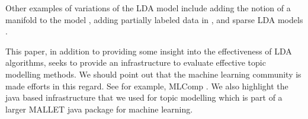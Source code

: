 Other examples of variations of the LDA model include adding the
notion of a manifold to the model \cite{DTM}, adding partially labeled
data in \cite{Partial}, and sparse LDA models
\cite{MimnoSparse}. 

This paper, in addition to providing some insight into the
effectiveness of LDA algorithms, seeks to provide an infrastructure to
evaluate effective topic modelling methods. We should point out that
the machine learning community is made efforts in this regard.  See
for example, MLComp \cite{MLComp}. We also highlight the java based
infrastructure that we used for topic modelling \cite{McCallumMALLET}
which is part of a larger MALLET java package for machine learning.
